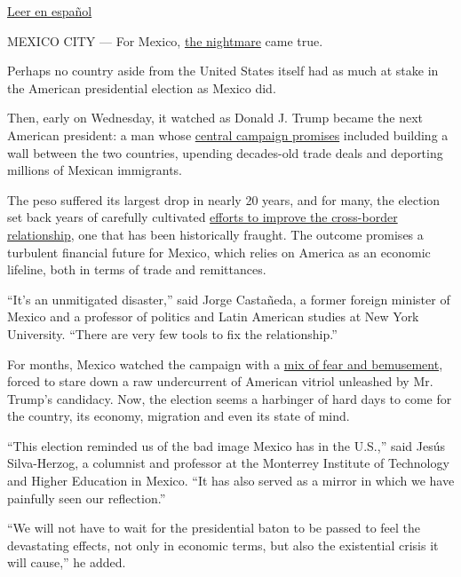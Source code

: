 \href{http://www.nytimes.com/es/2016/11/09/mexico-se-prepara-para-los-efectos-de-una-presidencia-de-trump/}{Leer
en español}

MEXICO CITY --- For Mexico,
\href{http://www.nytimes.com/2016/05/23/world/americas/donald-trump-mexico.html}{the
nightmare} came true.

Perhaps no country aside from the United States itself had as much at
stake in the American presidential election as Mexico did.

Then, early on Wednesday, it watched as Donald J. Trump became the next
American president: a man whose
\href{http://www.nytimes.com/2015/07/03/world/americas/donald-trump-gains-infamy-in-mexico-for-comments-on-immigrants.html}{central
campaign promises} included building a wall between the two countries,
upending decades-old trade deals and deporting millions of Mexican
immigrants.

The peso suffered its largest drop in nearly 20 years, and for many, the
election set back years of carefully cultivated
\href{http://www.nytimes.com/2016/09/01/world/americas/trump-mexico-pena-nieto-reaction.html}{efforts
to improve the cross-border relationship}, one that has been
historically fraught. The outcome promises a turbulent financial future
for Mexico, which relies on America as an economic lifeline, both in
terms of trade and remittances.

``It's an unmitigated disaster,'' said Jorge Castañeda, a former foreign
minister of Mexico and a professor of politics and Latin American
studies at New York University. ``There are very few tools to fix the
relationship.''

For months, Mexico watched the campaign with a
\href{http://www.nytimes.com/2015/07/03/world/americas/donald-trump-gains-infamy-in-mexico-for-comments-on-immigrants.html}{mix
of fear and bemusement}, forced to stare down a raw undercurrent of
American vitriol unleashed by Mr. Trump's candidacy. Now, the election
seems a harbinger of hard days to come for the country, its economy,
migration and even its state of mind.

``This election reminded us of the bad image Mexico has in the U.S.,''
said Jesús Silva-Herzog, a columnist and professor at the Monterrey
Institute of Technology and Higher Education in Mexico. ``It has also
served as a mirror in which we have painfully seen our reflection.''

``We will not have to wait for the presidential baton to be passed to
feel the devastating effects, not only in economic terms, but also the
existential crisis it will cause,'' he added.

